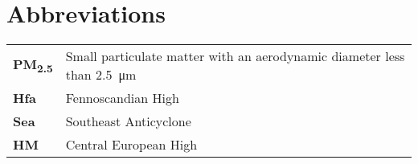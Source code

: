 \section*{Abbreviations}

\begin{tabular}{@{}ll@{}}
    \textbf{PM\textsubscript{2.5}} & Small particulate matter with an aerodynamic diameter less than \SI{2.5}{\micro\metre} \\[7mm]
    \textbf{Hfa} & Fennoscandian High \\[7mm]
    \textbf{Sea} & Southeast Anticyclone \\[7mm]
    \textbf{HM}  & Central European High \\
    \end{tabular}


